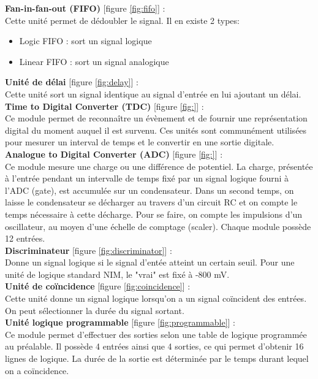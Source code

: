 \textbf{Fan-in-fan-out (FIFO)} [figure  \ref{fig:fifo}] :\\
Cette unité permet de dédoubler le signal. Il en existe 2 types:
\begin{itemize}
\item Logic FIFO : sort un signal logique
\item Linear FIFO : sort un signal analogique\\
\end{itemize}

\textbf{Unité de délai} [figure \ref{fig:delay}] :\\
Cette unité sort un signal identique au signal d'entrée en lui ajoutant un délai.\\

\textbf{Time to Digital Converter (TDC)} [figure \ref{fig:}] :\\
Ce module permet de reconnaître un évènement et de fournir une représentation digital du moment auquel il est survenu. Ces unités sont communément utilisées pour mesurer un interval de temps et le convertir en une sortie digitale.\\

\textbf{Analogue to Digital Converter (ADC)} [figure \ref{fig:}] :\\
Ce module mesure une charge ou une différence de potentiel. 
La charge, présentée à l’entrée pendant un intervalle de temps fixé par un signal logique fourni à l’ADC (gate), est accumulée sur un condensateur. Dans un second temps, on laisse le condensateur se décharger au travers d’un circuit RC et on compte le temps nécessaire à cette décharge. Pour se faire, on compte les impulsions d’un oscillateur, au moyen d’une échelle de comptage (scaler). Chaque module possède 12 entrées.\\

\textbf{Discriminateur} [figure \ref{fig:discriminator}] :\\
Donne un signal logique si le signal d'entée atteint un certain seuil. Pour une unité de logique standard NIM, le "vrai" est fixé à -800 mV.\\

\textbf{Unité de coïncidence} [figure \ref{fig:coincidence}] :\\
Cette unité donne un signal logique lorsqu'on a un signal coïncident des entrées. On peut sélectionner la durée du signal sortant.\\

\textbf{Unité logique programmable} [figure  \ref{fig:programmable}]  :\\
Ce module permet d'effectuer des sorties selon une table de logique programmée au préalable. Il possède 4 entrées ainsi que 4 sorties, ce qui permet d'obtenir 16 lignes de logique. La durée de la sortie est déterminée par le temps durant lequel on a coïncidence. \\